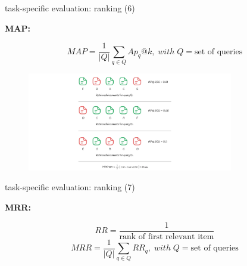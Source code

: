 \begin{vbframe}{task-specific evaluation: ranking (6)}

\vfill

\textbf{MAP:}

$$MAP = \dfrac{1}{|Q|} \sum_{q \in Q} Ap_q@k,\; with\; Q = \text{set of queries}$$

\begin{figure}
    \centering
    \includegraphics[width=9cm]{figure/42-ap-ex4.png}
\end{figure}

\vfill

\end{vbframe}


\begin{vbframe}{task-specific evaluation: ranking (7)}

\vfill

\textbf{MRR:}

$$RR = \dfrac{1}{\text{rank of first relevant item}}$$
$$MRR = \dfrac{1}{|Q|} \sum_{q \in Q} RR_q,\; with\; Q = \text{set of queries}$$

\vfill

\end{vbframe}


\endlecture
